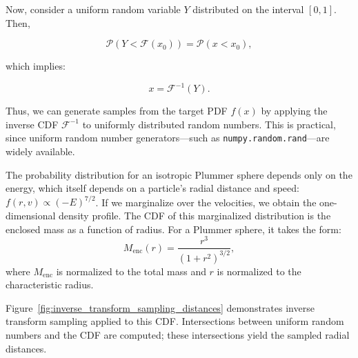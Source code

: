             Now, consider a uniform random variable $Y$ distributed on the interval $[0,1]$. Then,

            \begin{equation}
                \mathcal{P}(Y < \mathcal{F}(x_0)) = \mathcal{P}(x < x_0),
            \end{equation}

            which implies:

            \begin{equation}
                x = \mathcal{F}^{-1}(Y).
            \end{equation}

            Thus, we can generate samples from the target PDF $f(x)$ by applying the inverse CDF $\mathcal{F}^{-1}$ to uniformly distributed random numbers. This is practical, since uniform random number generators—such as \texttt{numpy.random.rand}—are widely available.

            The probability distribution for an isotropic Plummer sphere depends only on the energy, which itself depends on a particle's radial distance and speed: $f(r,v) \propto (-E)^{7/2}$. If we marginalize over the velocities, we obtain the one-dimensional density profile. The CDF of this marginalized distribution is the enclosed mass as a function of radius. For a Plummer sphere, it takes the form:
            \begin{equation}
                M_{\mathrm{enc}}(r) = \frac{r^3}{\left(1 + r^2\right)^{3/2}},
            \end{equation}
            where $M_{\mathrm{enc}}$ is normalized to the total mass and $r$ is normalized to the characteristic radius.

            Figure~\ref{fig:inverse_transform_sampling_distances} demonstrates inverse transform sampling applied to this CDF. Intersections between uniform random numbers and the CDF are computed; these intersections yield the sampled radial distances.

